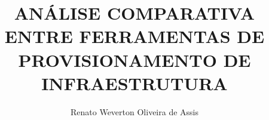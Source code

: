 \newcommand{\monog}{%
\uppercase{Análise Comparativa entre ferramentas de provisionamento de infraestrutura}
}
\title{\monog}
\newcommand{\por}{%
Renato Weverton Oliveira de Assis
}
\author{\por}

\newcommand{\subtitulo}{infraestrutura como código}

\newcommand{\univ}{\hspace{0.1cm}Pontifícia \hspace{0.1cm}Universidade\hspace{0.1cm} Católica \hspace{0.1cm}de\hspace{0.2cm} Minas\hspace{0.2cm} Gerais}

\newcommand{\curso}{\hspace{0.1cm} Programa \hspace{0.1cm} de \hspace{0.1cm} graduação\hspace{0.1cm} em \hspace{0.1cm} Sistema de Informação}

\newcommand{\grau}{Bacharel em Sistema de Informação}
\newcommand{\tipo}{Monografia }

\newcommand{\profOrientador}{Prof. Paulo César do Amaral Pereira}
\newcommand{\profA}{Prof. Nome do Avaliador}
\newcommand{\profB}{Prof. Nome do Avaliador}

\newcommand{\areaConcentracao}{Inteligência Computacional e Sistemas Distribuídos}

\newcommand{\cidade}{Belo Horizonte}

\newcommand{\ano}{2019}

\newcommand{\dataCompleta}{12 Dezembro de \ano}
